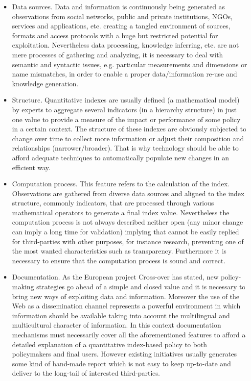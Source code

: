 \begin{itemize}
 \item Data sources. Data and information is continuously being generated as observations from social networks, public and private institutions, NGOs, services and applications, etc. 
 creating a tangled environment of sources, formats and access protocols with a huge but restricted potential for exploitation. Nevertheless data processing, knowledge inferring, etc. are not mere processes 
 of gathering and analyzing, it is necessary to deal with semantic and syntactic issues, e.g. particular measurements and dimensions or name mismatches, 
 in order to enable a proper data/information re-use and knowledge generation.
 
 \item Structure. Quantitative indexes are usually defined (a mathematical model) by experts to aggregate several indicators (in a hierarchy structure) in just one value to provide
 a measure of the impact or performance of some policy in a certain context. The structure of these indexes are obviously subjected to change over time 
 to collect more information or adjust their composition and relationships (narrower/broader). That is why technology should be able to afford 
 adequate techniques to automatically populate new changes in an efficient way.
 
  \item Computation process. This feature refers to the calculation of the index. Observations are gathered from diverse data sources and aligned 
  to the index structure, commonly indicators, that are processed through various mathematical operators to generate a final index value. 
  Nevertheless the computation process is not always described neither open (any minor change can imply a long time for validation) implying that 
  cannot be easily replied for third-parties with other purposes, for instance research, preventing one 
  of the most wanted characteristics such as transparency. Furthermore it is necessary to ensure that the computation process 
  is sound and correct.

  \item Documentation. As the European project Cross-over has stated, new policy-making strategies go ahead of a simple and closed value and it is necessary to bring 
  new ways of exploiting data and information. Moreover the use of the Web as a dissemination channel represents a powerful environment in which 
  information should be available taking into account the multilingual and multicultural character of information. In this context documentation mechanisms 
  must necessarily cover all the aforementioned features to afford a detailed explanation of a quantitative index-based policy to both policymakers 
  and final users. However existing initiatives usually generates some kind of hand-made report which is not easy to keep up-to-date and deliver 
  to the long-tail of interested third-parties.
\end{itemize}

